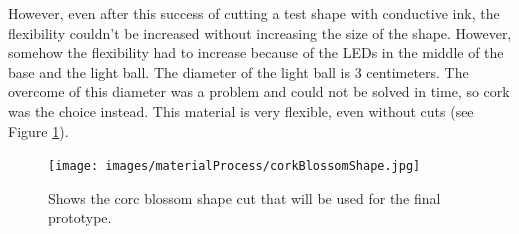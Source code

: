 \documentclass[04.3_buildingProcess.tex]{subfiles}
\begin{document}
\begin{flushleft}
        \noindent
        However, even after this success of cutting a test shape with conductive ink, the flexibility
        couldn't be increased without increasing the size of the shape. However, somehow the flexibility 
        had to increase because of the LEDs in the middle of the base and the light ball. 
        The diameter of the light ball is 3 centimeters. The overcome of this diameter was a problem
        and could not be solved in time, so cork was the choice instead. This material is very flexible, even 
        without cuts (see Figure \ref{fig:corkTest}).\\

        \begin{figure}[H]
            \centering
                \texttt{[image: images/materialProcess/corkBlossomShape.jpg]}
                \caption{Shows the corc blossom shape cut that will be used for the final prototype.}
                \label{fig:corkTest}
        \end{figure}
    \end{flushleft}
\end{document}
